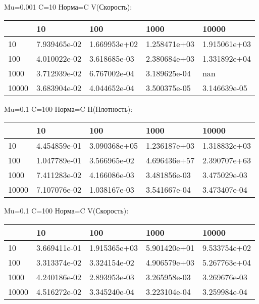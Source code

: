 \documentclass[a4paper, 12pt]{article}
\begin{document}
\bigskip
\bigskip
\bigskip


Mu=0.001  C=10 Норма=C V(Скорость):


\begin{tabular}{lllll}
\toprule
{} &         10    &         100   &         1000  &         10000 \\
\midrule
10    &  7.939465e-02 &  1.669953e+02 &  1.258471e+03 &  1.915061e+03 \\
100   &  4.010022e-02 &  3.618685e-03 &  2.380684e+03 &  1.331892e+04 \\
1000  &  3.712939e-02 &  6.767002e-04 &  3.189625e-04 &           nan \\
10000 &  3.683904e-02 &  4.044652e-04 &  3.500375e-05 &  3.146639e-05 \\
\bottomrule
\end{tabular}



\bigskip
\bigskip
\bigskip


Mu=0.1  C=100 Норма=C H(Плотность):


\begin{tabular}{lllll}
\toprule
{} &         10    &         100   &         1000  &         10000 \\
\midrule
10    &  4.454859e-01 &  3.090368e+05 &  1.236187e+03 &  1.318832e+03 \\
100   &  1.047789e-01 &  3.566965e-02 &  4.696436e+57 &  2.390707e+63 \\
1000  &  7.411283e-02 &  4.166086e-03 &  3.481856e-03 &  3.475029e-03 \\
10000 &  7.107076e-02 &  1.038167e-03 &  3.541667e-04 &  3.473407e-04 \\
\bottomrule
\end{tabular}



\bigskip
\bigskip
\bigskip


Mu=0.1  C=100 Норма=C V(Скорость):


\begin{tabular}{lllll}
\toprule
{} &         10    &         100   &         1000  &         10000 \\
\midrule
10    &  3.669411e-01 &  1.915365e+03 &  5.901420e+01 &  9.533754e+02 \\
100   &  3.313374e-02 &  3.324154e-02 &  4.906579e+03 &  5.267763e+04 \\
1000  &  4.240186e-02 &  2.893953e-03 &  3.265958e-03 &  3.269676e-03 \\
10000 &  4.516272e-02 &  3.345240e-04 &  3.223104e-04 &  3.259984e-04 \\
\bottomrule
\end{tabular}
\end{document}
